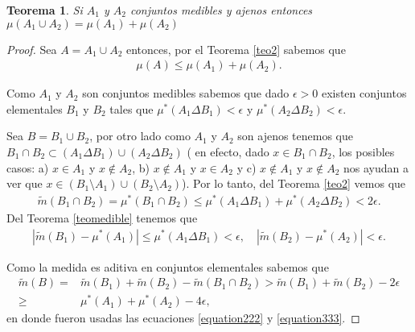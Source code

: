 \documentclass[twoside,12pt,a4 paper,openright]{book}
\newtheorem{teo}[claim]{Teorema}
\begin{document}
\begin{teo}
    Si $A_1$ y $A_2$ conjuntos medibles y ajenos  entonces  $\mu(A_1\cup A_2) = \mu(A_1) + \mu(A_2)$
\end{teo}
\begin{proof}
    Sea $A = A_1 \cup A_2$ entonces, por el Teorema \ref{teo2} sabemos que  
 \begin{align}\label{equation111} 
\mu(A) \leq \mu(A_1) + \mu(A_2).
\end{align}

    Como $A_1$ y $A_2$ son conjuntos medibles sabemos que dado $\epsilon> 0$ existen  conjuntos elementales $B_1$ y  $B_2$ tales que 
    $\mu^*(A_1\Delta B_1)<\epsilon$ y $\mu^*(A_2\Delta B_2)<\epsilon$. 

    Sea $B = B_1 \cup B_2$, por otro lado como $A_1$ y $A_2$ son ajenos tenemos que $B_1 \cap B_2 \subset (A_1\Delta B_1)\cup (A_2 \Delta B_2)$ ( en efecto, dado $x \in B_1\cap B_2$, los posibles casos:  a)  $x\in A_1$  y $x\notin  A_2$,  b) $x\notin A_1$  y $x\in  A_2$  y c) 
    $x\notin A_1$  y $x\notin  A_2$ nos ayudan a ver que 
       $x\in (B_1\setminus A_1)\cup (B_2 \setminus A_2)$). Por lo tanto, del Teorema \ref{teo2}
    vemos que  
    \begin{align}\label{equation222} 
\tilde{m}(B_1\cap B_2) = \mu^*(B_1\cap B_2)  \leq \mu^*(A_1\Delta B_1) + \mu^*(A_2\Delta B_2) < 2\epsilon .
\end{align}
Del Teorema \ref{teomedible} tenemos que 
    \begin{align}\label{equation333} 
|\tilde{m}(B_1) - \mu^*(A_1)|\leq \mu^*(A_1 \Delta B_1) < \epsilon, \quad 
|\tilde{m}(B_2) - \mu^*(A_2)| < \epsilon . 
\end{align}

    Como la medida es aditiva en conjuntos elementales sabemos que 
    \begin{align}\label{equation444}
        \tilde{m}(B) =& \tilde{m}(B_1) + \tilde{m}(B_2) - \tilde{m}(B_1\cap B_2)  >  \tilde{m}(B_1) + \tilde{m}(B_2) - 2\epsilon  \nonumber \\
        \geq& \mu^*(A_1) + \mu^*(A_2) - 4\epsilon ,    \end{align}
        en donde fueron usadas las ecuaciones \eqref{equation222} y \eqref{equation333}.
        

\end{proof}
\end{document}
